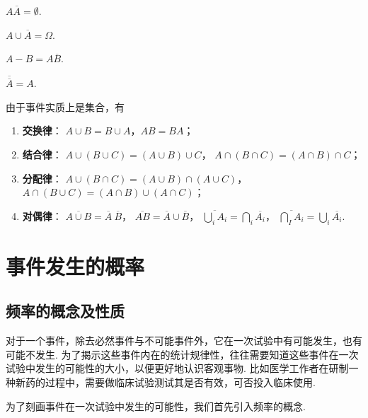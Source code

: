 \begin{property}
\(A \overline{A} = \emptyset\).
\end{property}

\begin{property}
\(A \cup \overline{A} = \Omega\).
\end{property}

\begin{property}
\(A - B = A \overline{B}\).
\end{property}

\begin{property}
\(\overline{\overline{A}} = A\).
\end{property}

\begin{theorem}[事件的运算规律]
由于事件实质上是集合，有
\begin{enumerate}
\item \textbf{交换律}：
\(A \cup B = B \cup A\)，\(A B = B A\)；
\item \textbf{结合律}：
\(A \cup (B \cup C) = (A \cup B) \cup C\)，%
\(A \cap (B \cap C) = (A \cap B) \cap C\)；
\item \textbf{分配律}：
\(A \cup (B \cap C) = (A \cup B) \cap (A \cup C)\)，%
\(A \cap (B \cup C) = (A \cap B) \cup (A \cap C)\)；
\item \textbf{对偶律}：
\(\overline{A \cup B} = \overline{A}\ \overline{B}\)，%
\(\overline{AB} = \overline{A} \cup \overline{B}\)，%
\(\overline{\bigcup_{i}{A_i}} = \bigcap_{i}{\overline{A_i}}\)，%
\(\overline{\bigcap_{I}{A_i}} = \bigcup_{i}{\overline{A_i}}\).
\end{enumerate}
\end{theorem}

\section{事件发生的概率}

\subsection{频率的概念及性质}
对于一个事件，除去必然事件与不可能事件外，它在一次试验中有可能发生，也有可能不发生.
为了揭示这些事件内在的统计规律性，往往需要知道这些事件在一次试验中发生的可能性的大小，以便更好地认识客观事物.
比如医学工作者在研制一种新药的过程中，需要做临床试验测试其是否有效，可否投入临床使用.

为了刻画事件在一次试验中发生的可能性，我们首先引入频率的概念.


